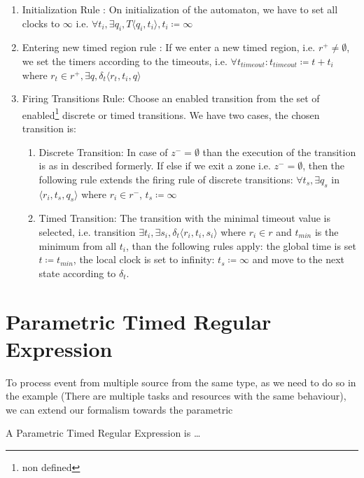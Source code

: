 			\begin{enumerate}
				\item Initialization Rule : On initialization of the automaton, we have to set all clocks to $\infty$ 
				i.e. $\forall t_i, \exists q_i, T \langle q_i, t_i \rangle, t_i \coloneqq \infty $
			
				\item Entering new timed region rule :
				If we enter a new timed region, 
				i.e. $r^+ \neq \emptyset$, 
				we set the timers according to the timeouts, 
				i.e. $\forall t_{timeout} : t_{timeout} \coloneqq t + t_i $ where $ r_t \in r^+, \exists q ,\delta_t\langle  r_t,t_i,q \rangle$
				
				\item Firing Transitions Rule: Choose an enabled transition from the set of enabled\footnote{non defined} discrete or timed transitions. 
				We have two cases, the chosen transition is:
					\begin{enumerate}
						\item Discrete Transition: In case of $z^- = \emptyset$ than the execution of the transition is as in described formerly. 
							If else if we exit a zone i.e. $z^- = \emptyset$, 
							then the following rule extends the firing rule of discrete transitions:
							$\forall t_s, \exists q_s$ in $\langle r_i, t_s, q_s \rangle$ where $r_i \in r^-$, $t_s \coloneqq \infty$
						\item Timed Transition: The transition with the minimal timeout value is selected, 
							 i.e. transition $\exists t_i, \exists s_i, \delta_t \langle r_i, t_i, s_i \rangle$ where $ r_i \in r$ and $t_{min}$ is the minimum from all $t_i$,
							 than the following rules apply:
							 the global time is set $t \coloneqq t_{min}$, the local clock is set to infinity: $t_s \coloneqq \infty$ and move to the next state according to $\delta_t$.
					\end{enumerate}			
			\end{enumerate}


		
	\section{Parametric Timed Regular Expression}
		To process event from multiple source from the same type, as we need to do so in the example (There are multiple tasks and resources with the same behaviour),
		we can extend our formalism towards the parametric 
		
		\begin{dfn}
		A Parametric Timed Regular Expression is \dots %
		\end{dfn}
	
